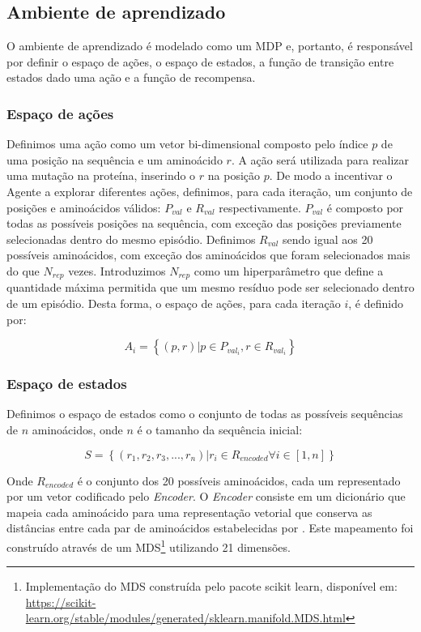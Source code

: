 \subsection{Ambiente de aprendizado}
O ambiente de aprendizado é modelado como um MDP e, portanto, é responsável por definir o espaço de ações, o espaço de estados, a função de transição entre estados dado uma ação e a função de recompensa.  

\subsubsection{Espaço de ações}

Definimos uma ação como um vetor bi-dimensional composto pelo índice $p$ de uma posição na sequência e um aminoácido $r$. 
A ação será utilizada para realizar uma mutação na proteína, inserindo o $r$ na posição $p$. 
De modo a incentivar o Agente a explorar diferentes ações, 
definimos, para cada iteração, um conjunto de posições e aminoácidos válidos: $P_{val}$ e $R_{val}$ respectivamente. 
$P_{val}$ é composto por todas as possíveis posições na sequência, com exceção das posições previamente selecionadas dentro do mesmo episódio. 
Definimos $R_{val}$ sendo igual aos 20 possíveis aminoácidos, com exceção dos aminoácidos que foram selecionados 
mais do que $N_{rep}$ vezes. Introduzimos $N_{rep}$ como um hiperparâmetro que define a quantidade máxima 
permitida que um mesmo resíduo pode ser selecionado dentro de um episódio.   %
Desta forma, o espaço de ações, para cada iteração $i$, é definido por:

\begin{equation}
A_{i} = \left\{(p, r) | p \in P_{val_{i}} , r \in R_{val_{i}} \right\}
\end{equation}
  

\subsubsection{Espaço de estados}
Definimos o espaço de estados como o conjunto de todas as possíveis sequências de $n$ aminoácidos, 
onde $n$ é o tamanho da sequência inicial:

\begin{equation}
S = \left\{(r_{1}, r_{2}, r_{3}, ..., r_{n}) | r_{i} \in R_{encoded} \forall i \in [1,n] \right\}
\end{equation}

Onde $R_{encoded}$ é o conjunto dos 20 possíveis aminoácidos, 
cada um representado por um vetor codificado pelo \textit{Encoder}. 
O \textit{Encoder} consiste em um dicionário que mapeia cada aminoácido para 
uma representação vetorial que conserva as distâncias entre cada par de aminoácidos estabelecidas por \cite{aminodist}.
Este mapeamento foi construído através de um MDS\footnote{Implementação do MDS construída pelo pacote scikit learn, disponível em: \url{https://scikit-learn.org/stable/modules/generated/sklearn.manifold.MDS.html}} utilizando 21 dimensões. 

